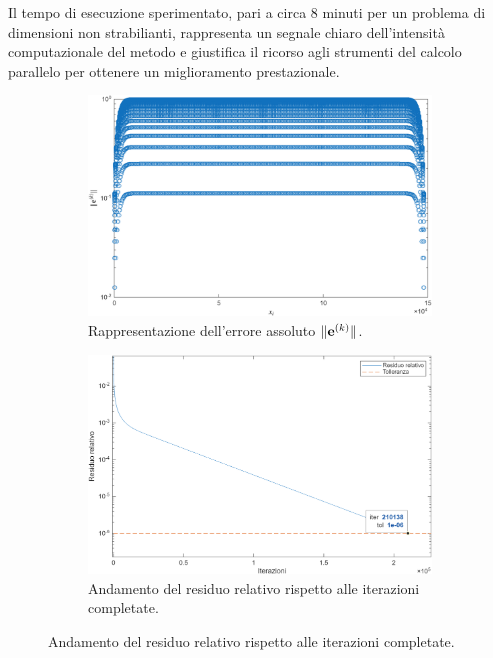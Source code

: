 Il tempo di esecuzione sperimentato, pari a circa $\num{8}$ minuti per un problema di dimensioni non strabilianti, rappresenta un segnale chiaro 
dell'intensit\`a computazionale del metodo e giustifica il ricorso agli strumenti del calcolo parallelo per ottenere un miglioramento prestazionale.
\begin{figure}[!htbp]
    \centering
    \begin{subfigure}{0.6\textwidth}
        \centering
        \includegraphics[width=\linewidth]{../Risorse/Capitolo 3/erroreAssolutoJacobi1.png}
        \caption{Rappresentazione dell'errore assoluto $\lVert\mathbf{e}^{(k)}\rVert$.}
        \label{fig:erroreAssolutoJacobi1}
    \end{subfigure}

    \vspace{1.5em}

    \begin{subfigure}{0.6\textwidth}
        \centering
        \includegraphics[width=\linewidth]{../Risorse/Capitolo 3/evoluzioneResiduoRelativo.png}
        \caption{Andamento del residuo relativo rispetto alle iterazioni completate.}
        \label{fig:evoluzioneResiduoRelativo}
    \end{subfigure}


\end{figure}
